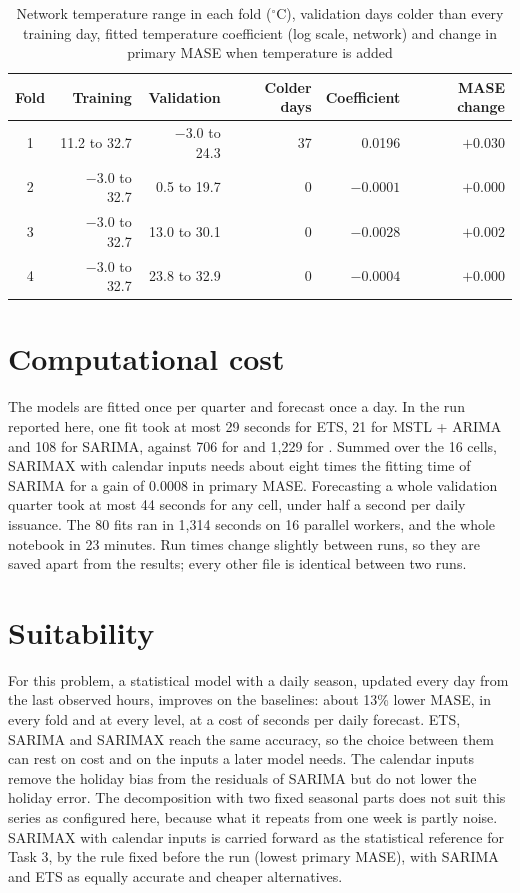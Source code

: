 \documentclass[12pt,a4paper,openany]{report}
\begin{document}
\begin{table}[!htb]
  \centering\small
  \caption{Network temperature range in each fold ($^\circ$C), validation days colder than every training day, fitted
  temperature coefficient (log scale, network) and change in primary MASE when temperature is added}
  \label{tab:stat-weather}
  \setlength{\tabcolsep}{5pt}
  \begin{tabular}{crrrrr}
    \toprule
    Fold & Training & Validation & Colder days & Coefficient & MASE change \\
    \midrule
    1 & 11.2 to 32.7 & $-3.0$ to 24.3 & 37 & 0.0196 & $+0.030$ \\
    2 & $-3.0$ to 32.7 & 0.5 to 19.7 & 0 & $-0.0001$ & $+0.000$ \\
    3 & $-3.0$ to 32.7 & 13.0 to 30.1 & 0 & $-0.0028$ & $+0.002$ \\
    4 & $-3.0$ to 32.7 & 23.8 to 32.9 & 0 & $-0.0004$ & $+0.000$ \\
    \bottomrule
  \end{tabular}
\end{table}

\section{Computational cost}\label{sec:cost}

The models are fitted once per quarter and forecast once a day. In the run reported here, one fit took at most 29
seconds for \ac{ETS}, 21 for \ac{MSTL} + \ac{ARIMA} and 108 for \ac{SARIMA}, against 706 for  and
1,229 for . Summed over the 16 cells, \ac{SARIMAX} with calendar inputs needs about eight times
the fitting time of \ac{SARIMA} for a gain of 0.0008 in primary \ac{MASE}. Forecasting a whole validation quarter took
at most 44 seconds for any cell, under half a second per daily issuance. The 80 fits ran in 1,314 seconds on 16
parallel workers, and the whole notebook in 23 minutes. Run times change slightly between runs, so they are saved
apart from the results; every other file is identical between two runs.

\section{Suitability}\label{sec:suitability}

For this problem, a statistical model with a daily season, updated every day from the last observed hours, improves
on the baselines: about 13\% lower \ac{MASE}, in every fold and at every level, at a cost of seconds per
daily forecast. \ac{ETS}, \ac{SARIMA} and \ac{SARIMAX} reach the same accuracy, so the choice between them can rest
on cost and on the inputs a later model needs. The calendar inputs remove the holiday bias from the residuals of
\ac{SARIMA} but do not lower the holiday error. The decomposition with two fixed seasonal parts does not suit this
series as configured here, because what it repeats from one week is partly noise. \ac{SARIMAX} with calendar inputs is
carried forward as the statistical reference for Task 3, by the rule fixed before the run (lowest primary
\ac{MASE}), with \ac{SARIMA} and \ac{ETS} as equally accurate and cheaper alternatives.
\end{document}
